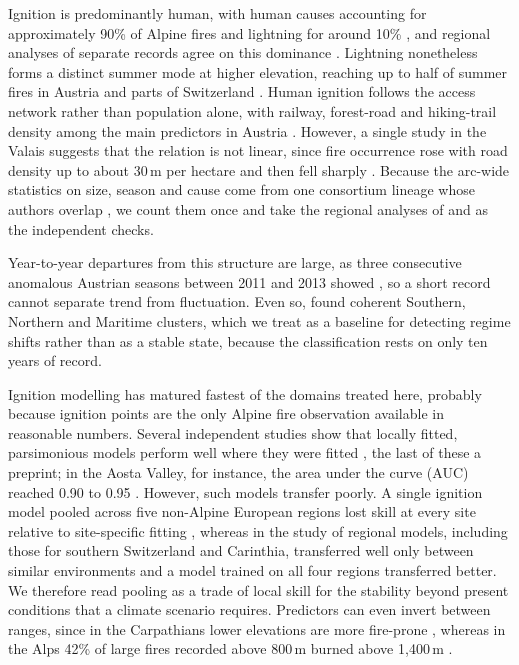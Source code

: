 \documentclass[11pt,a4paper]{article}
\begin{document}
Ignition is predominantly human, with human causes accounting for approximately 90\% of Alpine fires and lightning for around 10\% \citep{muller_forest_2020, valese_wildfires_2011}, and regional analyses of separate records agree on this dominance \citep{zumbrunnen_human_2012, vacchiano_modeling_2018}. Lightning nonetheless forms a distinct summer mode at higher elevation, reaching up to half of summer fires in Austria and parts of Switzerland \citep{muller_forest_2020, conedera_lightninginduced_2006}. Human ignition follows the access network rather than population alone, with railway, forest-road and hiking-trail density among the main predictors in Austria \citep{arndt_modeling_2013}. However, a single study in the Valais suggests that the relation is not linear, since fire occurrence rose with road density up to about 30\,m per hectare and then fell sharply \citep{zumbrunnen_human_2012}. Because the arc-wide statistics on size, season and cause come from one consortium lineage whose authors overlap \citep{muller_forest_2020, valese_wildfires_2011, conedera_characterizing_2018}, we count them once and take the regional analyses of \citet{vacchiano_modeling_2018} and \citet{zumbrunnen_human_2012} as the independent checks.

Year-to-year departures from this structure are large, as three consecutive anomalous Austrian seasons between 2011 and 2013 showed \citep{muller_anomalies_2015}, so a short record cannot separate trend from fluctuation. Even so, \citet{conedera_characterizing_2018} found coherent Southern, Northern and Maritime clusters, which we treat as a baseline for detecting regime shifts rather than as a stable state, because the classification rests on only ten years of record.

Ignition modelling has matured fastest of the domains treated here, probably because ignition points are the only Alpine fire observation available in reasonable numbers. Several independent studies show that locally fitted, parsimonious models perform well where they were fitted \citep{vacchiano_modeling_2018, arndt_modeling_2013, de_angelis_modelling_2015, moreno_spacetime_2025}, the last of these a preprint; in the Aosta Valley, for instance, the area under the curve (AUC) reached 0.90 to 0.95 \citep{vacchiano_modeling_2018}. However, such models transfer poorly. A single ignition model pooled across five non-Alpine European regions lost skill at every site relative to site-specific fitting \citep{gelabert_assessing_2025}, whereas in the study of \citet{bekar_crossregional_2020} regional models, including those for southern Switzerland and Carinthia, transferred well only between similar environments and a model trained on all four regions transferred better. We therefore read pooling as a trade of local skill for the stability beyond present conditions that a climate scenario requires. Predictors can even invert between ranges, since in the Carpathians lower elevations are more fire-prone \citep{manczinger_fire_2025}, whereas in the Alps 42\% of large fires recorded above 800\,m burned above 1{,}400\,m \citep{beloiu_climatedriven_2026}.
\end{document}
